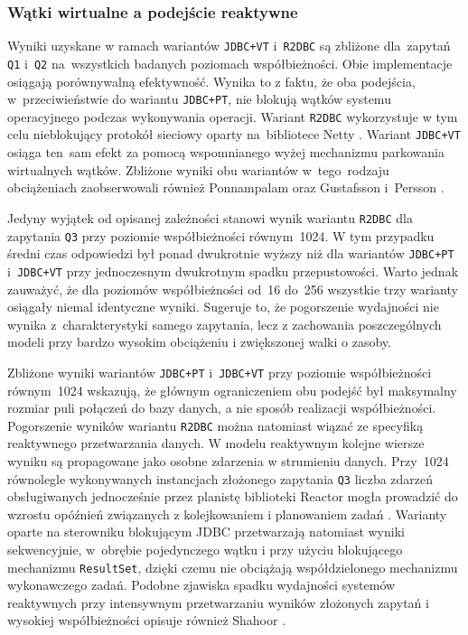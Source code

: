 \subsubsection{Wątki wirtualne a podejście reaktywne}
Wyniki uzyskane w ramach wariantów \texttt{JDBC+VT} i~\texttt{R2DBC} są zbliżone dla~zapytań \texttt{Q1} i~\texttt{Q2} na~wszystkich badanych poziomach współbieżności. Obie implementacje osiągają porównywalną efektywność. Wynika to z faktu, że oba podejścia, w~przeciwieństwie do wariantu \texttt{JDBC+PT}, nie blokują wątków systemu operacyjnego podczas wykonywania operacji. Wariant \texttt{R2DBC} wykorzystuje w tym celu nieblokujący protokół sieciowy oparty na~bibliotece Netty \cite{r2dbc-documentation}. Wariant \texttt{JDBC+VT} osiąga ten~sam efekt za pomocą wspomnianego wyżej mechanizmu parkowania wirtualnych wątków. Zbliżone wyniki obu wariantów w~tego~rodzaju obciążeniach zaobserwowali również Ponnampalam \cite{ponnampalam2025} oraz Gustafsson i~Persson \cite{gustafsson2024}.

Jedyny wyjątek od opisanej zależności stanowi wynik wariantu \texttt{R2DBC} dla zapytania \texttt{Q3} przy poziomie współbieżności równym~1024. W tym przypadku średni czas odpowiedzi był ponad dwukrotnie wyższy niż dla wariantów \texttt{JDBC+PT} i~\texttt{JDBC+VT} przy jednoczesnym dwukrotnym spadku przepustowości. Warto jednak zauważyć, że dla poziomów współbieżności od~16 do~256 wszystkie trzy warianty osiągały niemal identyczne wyniki. Sugeruje to, że pogorszenie wydajności nie wynika z~charakterystyki samego zapytania, lecz z zachowania poszczególnych modeli przy bardzo wysokim obciążeniu i zwiększonej walki o zasoby.

Zbliżone wyniki wariantów \texttt{JDBC+PT} i~\texttt{JDBC+VT} przy poziomie współbieżności równym~1024 wskazują, że głównym ograniczeniem obu podejść był maksymalny rozmiar puli połączeń do bazy danych, a nie sposób realizacji współbieżności. Pogorszenie wyników wariantu \texttt{R2DBC} można natomiast wiązać ze specyfiką reaktywnego przetwarzania danych. W modelu reaktywnym kolejne wiersze wyniku są propagowane jako osobne zdarzenia w strumieniu danych. Przy~1024 równolegle wykonywanych instancjach złożonego zapytania \texttt{Q3} liczba zdarzeń obsługiwanych jednocześnie przez planistę biblioteki Reactor mogła prowadzić do wzrostu opóźnień związanych z kolejkowaniem i planowaniem zadań \cite{reactive-manifesto-page}. Warianty oparte na sterowniku blokującym JDBC przetwarzają natomiast wyniki sekwencyjnie, w~obrębie pojedynczego wątku i przy użyciu blokującego mechanizmu \texttt{ResultSet}, dzięki czemu nie obciążają współdzielonego mechanizmu wykonawczego zadań. Podobne zjawiska spadku wydajności systemów reaktywnych przy intensywnym przetwarzaniu wyników złożonych zapytań i wysokiej współbieżności opisuje również Shahoor \cite{shahoor2024}.

